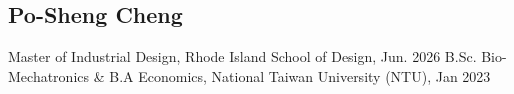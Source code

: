 \documentclass[12pt]{article}
\begin{document}
\begin{multicols}{2}
    \section*{Po-Sheng Cheng}
    \columnbreak
    {\sffamily
    Master of Industrial Design, Rhode Island School of Design, Jun. 2026 \newline
    B.Sc. Bio-Mechatronics \& B.A Economics, National Taiwan University (NTU), Jan 2023
    }
\end{multicols}
     
    
\end{document}
